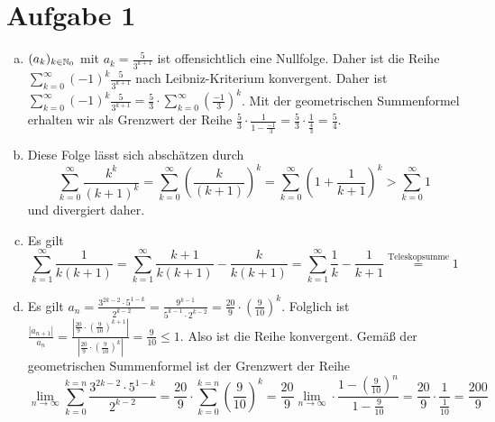 \documentclass{article}
\newcommand{\mylim}{\lim\limits_{n\to \infty}}
\begin{document}
	\section*{Aufgabe 1}
	\begin{enumerate}[(a)]
		\item $(a_k)_{k\in \mathbb{N}_0}$ mit $a_{k} = \frac{5}{3^{k+1}}$ ist offensichtlich eine Nullfolge. Daher ist die Reihe $\displaystyle \sum_{k = 0}^{\infty} (-1)^k \frac{5}{3^{k+1}}$ nach Leibniz-Kriterium konvergent. Daher ist $\displaystyle \sum_{k = 0}^{\infty} (-1)^k \frac{5}{3^{k+1}} = \frac{5}{3} \cdot \sum_{k=0}^{\infty} \left(\frac{-1}{3}\right)^k$. Mit der geometrischen Summenformel erhalten wir als Grenzwert der Reihe $\frac{5}{3}\cdot \frac{1}{1-\frac{-1}{3}} = \frac{5}{3} \cdot \frac{1}{\frac{4}{3}} = \frac{5}{4}$.
		\item Diese Folge lässt sich abschätzen durch $$\sum_{k=0}^{\infty} \frac{k^k}{(k+1)^k} = \sum_{k=0}^{\infty} \left(\frac{k}{(k+1)}\right)^k = \sum_{k=0}^{\infty} \left(1 + \frac{1}{k+1}\right)^k > \sum_{k=0}^{\infty} 1$$ und divergiert daher.
		\item Es gilt $$\sum_{k=1}^{\infty} \frac{1}{k(k+1)} = \sum_{k=1}^{\infty} \frac{k+1}{k(k+1)} - \frac{k}{k(k+1)} = \sum_{k=1}^{\infty} \frac{1}{k} - \frac{1}{k+1} \overset{\text{Teleskopsumme}}{=} 1$$
		\item Es gilt $a_n = \frac{3^{2k-2} \cdot 5^{1-k}}{2^{k-2}} = \frac{9^{k-1}}{5^{k-1} \cdot 2^{k-2}} = \frac{20}{9}\cdot \left(\frac{9}{10}\right)^{k}$. Folglich ist $\frac{|a_{n+1}|}{a_n} = \frac{|\frac{20}{9}\cdot \left(\frac{9}{10}\right)^{k+1}|}{|\frac{20}{9}\cdot \left(\frac{9}{10}\right)^{k}|} = \frac{9}{10} \leq 1$. Also ist die Reihe konvergent. Gemäß der geometrischen Summenformel ist der Grenzwert der Reihe $$\mylim \sum_{k=0}^{k = n} \frac{3^{2k-2} \cdot 5^{1-k}}{2^{k-2}} = \frac{20}{9}\cdot \sum_{k=0}^{k = n} \left(\frac{9}{10}\right)^{k} = \frac{20}{9} \mylim \cdot \frac{1-\left(\frac{9}{10}\right)^n}{1 - \frac{9}{10}} = \frac{20}{9} \cdot \frac{1}{\frac{1}{10}} = \frac{200}{9}$$
	\end{enumerate}
\end{document}
